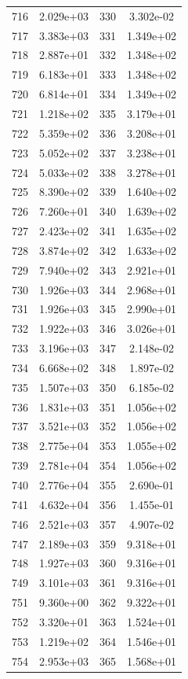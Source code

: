 \documentclass[12pt]{article}
\begin{document}
\begin{longtable}{@{}cccc@{}}
716 & 2.029e+03 & 330 & 3.302e-02 \\
717 & 3.383e+03 & 331 & 1.349e+02 \\
718 & 2.887e+01 & 332 & 1.348e+02 \\
719 & 6.183e+01 & 333 & 1.348e+02 \\
720 & 6.814e+01 & 334 & 1.349e+02 \\
721 & 1.218e+02 & 335 & 3.179e+01 \\
722 & 5.359e+02 & 336 & 3.208e+01 \\
723 & 5.052e+02 & 337 & 3.238e+01 \\
724 & 5.033e+02 & 338 & 3.278e+01 \\
725 & 8.390e+02 & 339 & 1.640e+02 \\
726 & 7.260e+01 & 340 & 1.639e+02 \\
727 & 2.423e+02 & 341 & 1.635e+02 \\
728 & 3.874e+02 & 342 & 1.633e+02 \\
729 & 7.940e+02 & 343 & 2.921e+01 \\
730 & 1.926e+03 & 344 & 2.968e+01 \\
731 & 1.926e+03 & 345 & 2.990e+01 \\
732 & 1.922e+03 & 346 & 3.026e+01 \\
733 & 3.196e+03 & 347 & 2.148e-02 \\
734 & 6.668e+02 & 348 & 1.897e-02 \\
735 & 1.507e+03 & 350 & 6.185e-02 \\
736 & 1.831e+03 & 351 & 1.056e+02 \\
737 & 3.521e+03 & 352 & 1.056e+02 \\
738 & 2.775e+04 & 353 & 1.055e+02 \\
739 & 2.781e+04 & 354 & 1.056e+02 \\
740 & 2.776e+04 & 355 & 2.690e-01 \\
741 & 4.632e+04 & 356 & 1.455e-01 \\
746 & 2.521e+03 & 357 & 4.907e-02 \\
747 & 2.189e+03 & 359 & 9.318e+01 \\
748 & 1.927e+03 & 360 & 9.316e+01 \\
749 & 3.101e+03 & 361 & 9.316e+01 \\
751 & 9.360e+00 & 362 & 9.322e+01 \\
752 & 3.320e+01 & 363 & 1.524e+01 \\
753 & 1.219e+02 & 364 & 1.546e+01 \\
754 & 2.953e+03 & 365 & 1.568e+01 \\

\end{longtable}
\end{document}
